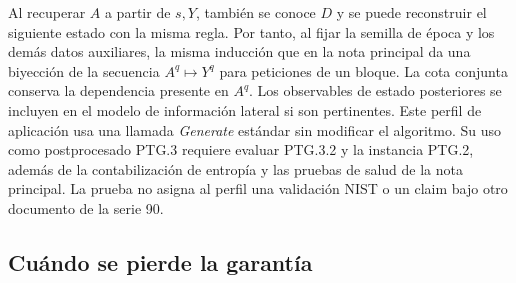 \documentclass[11pt,a4paper]{article}
\begin{document}
Al recuperar $A$ a partir de $s,Y$, también se conoce $D$ y se puede
reconstruir el siguiente estado con la misma regla. Por tanto, al
fijar la semilla de época y los demás datos auxiliares, la misma
inducción que en la nota principal da una biyección de la secuencia
$A^q\mapsto Y^q$ para peticiones de un bloque. La cota conjunta
conserva la dependencia presente en $A^q$. Los observables de
estado posteriores se incluyen en el modelo de información lateral
si son pertinentes. Este perfil de aplicación usa una llamada
\emph{Generate} estándar sin modificar el algoritmo. Su uso como
postprocesado PTG.3 requiere evaluar PTG.3.2 y la instancia
PTG.2, además de la contabilización de entropía y las pruebas
de salud de la nota principal. La prueba no asigna al perfil una
validación NIST o un claim bajo otro documento de la serie 90.

\subsection{Cuándo se pierde la garantía}
\end{document}
